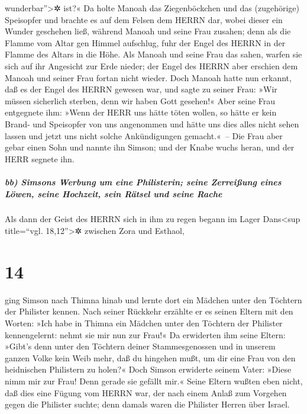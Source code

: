 wunderbar''\textgreater✲ ist?« Da holte Manoah das
Ziegenböckchen und das (zugehörige) Speisopfer und brachte es auf dem
Felsen dem HERRN dar, wobei dieser ein Wunder geschehen ließ, während
Manoah und seine Frau zusahen; denn als die Flamme vom
Altar gen Himmel aufschlug, fuhr der Engel des HERRN in der Flamme des
Altars in die Höhe. Als Manoah und seine Frau das sahen, warfen sie sich
auf ihr Angesicht zur Erde nieder; der Engel des HERRN
aber erschien dem Manoah und seiner Frau fortan nicht wieder. Doch
Manoah hatte nun erkannt, daß es der Engel des HERRN gewesen war,
und sagte zu seiner Frau: »Wir müssen sicherlich sterben,
denn wir haben Gott gesehen!« Aber seine Frau entgegnete
ihm: »Wenn der HERR uns hätte töten wollen, so hätte er kein Brand- und
Speisopfer von uns angenommen und hätte uns dies alles nicht sehen
lassen und jetzt uns nicht solche Ankündigungen gemacht.«~--
Die Frau aber gebar einen Sohn und nannte ihn Simson; und
der Knabe wuchs heran, und der HERR segnete ihn.

\hypertarget{bb-simsons-werbung-um-eine-philisterin-seine-zerreiuxdfung-eines-luxf6wen-seine-hochzeit-sein-ruxe4tsel-und-seine-rache}{%
\subparagraph{bb) Simsons Werbung um eine Philisterin; seine Zerreißung
eines Löwen, seine Hochzeit, sein Rätsel und seine
Rache}\label{bb-simsons-werbung-um-eine-philisterin-seine-zerreiuxdfung-eines-luxf6wen-seine-hochzeit-sein-ruxe4tsel-und-seine-rache}}

Als dann der Geist des HERRN sich in ihm zu regen begann
im Lager Dans\textless sup title=``vgl. 18,12''\textgreater✲ zwischen
Zora und Esthaol,

\hypertarget{section-13}{%
\section{14}\label{section-13}}

ging Simson nach Thimna hinab und lernte dort ein Mädchen
unter den Töchtern der Philister kennen. Nach seiner
Rückkehr erzählte er es seinen Eltern mit den Worten: »Ich habe in
Thimna ein Mädchen unter den Töchtern der Philister kennengelernt: nehmt
sie mir nun zur Frau!« Da erwiderten ihm seine Eltern:
»Gibt's denn unter den Töchtern deiner Stammesgenossen und in unserem
ganzen Volke kein Weib mehr, daß du hingehen mußt, um dir eine Frau von
den heidnischen Philistern zu holen?« Doch Simson erwiderte seinem
Vater: »Diese nimm mir zur Frau! Denn gerade sie gefällt mir.«
Seine Eltern wußten eben nicht, daß dies eine Fügung vom
HERRN war, der nach einem Anlaß zum Vorgehen gegen die Philister suchte;
denn damals waren die Philister Herren über Israel.

